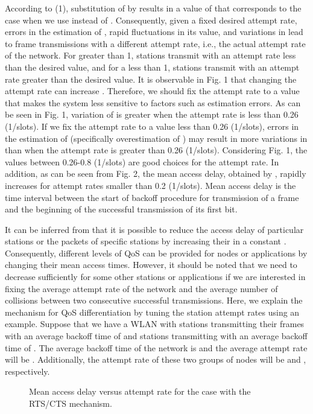\documentclass[10pt,twocolumn,oneside,submit]{JCNtran}
\begin{document}
\par According to (1), substitution of  by  results in a value of  that corresponds to the case when we use  instead of . Consequently, given a fixed desired attempt rate, errors in the estimation of , rapid fluctuations in its value, and variations in  lead to frame transmissions with a different attempt rate, i.e., the actual attempt rate of the network. For  greater than 1, stations transmit with an attempt rate less than the desired value, and for a  less than 1, stations transmit with an attempt rate greater than the desired value. It is observable in Fig. 1 that changing the attempt rate can increase . Therefore, we should fix the attempt rate to a value that makes the system less sensitive to factors such as estimation errors. As can be seen in Fig. 1, variation of  is greater when the attempt rate is less than 0.26 (1/slots). If we fix the attempt rate to a value less than 0.26 (1/slots), errors in the estimation of  (specifically overestimation of ) may result in more variations in  than when the attempt rate is greater than 0.26 (1/slots). Considering Fig. 1, the values between 0.26-0.8 (1/slots) are good choices for the attempt rate. In addition, as can be seen from Fig. 2, the mean access delay, obtained by  , rapidly increases for attempt rates smaller than 0.2 (1/slots). Mean access delay is the time interval between the start of backoff procedure for transmission of a frame and the beginning of the successful transmission of its first bit.
\par It can be inferred from  that it is possible to reduce the access delay of particular stations or the packets of specific stations by increasing their  in a constant . Consequently, different levels of QoS can be provided for nodes or applications by changing their mean access times. However, it should be noted that we need to decrease  sufficiently for some other stations or applications if we are interested in fixing the average attempt rate of the network and the average number of collisions between two consecutive successful transmissions. Here, we explain the mechanism for QoS differentiation by tuning the station attempt rates using an example. Suppose that we have a WLAN with  stations transmitting their frames with an average backoff time of  and  stations transmitting with an average backoff time of . The average backoff time of the network is  and the average attempt rate will be . Additionally, the attempt rate of these two groups of nodes will be  and , respectively.
\begin{figure}[t]
\begin{center}
\epsfxsize=8cm \leavevmode{} \caption{Mean access delay versus attempt rate for the case with the RTS/CTS mechanism.} \label{fig:2}
\end{center}
\end{figure}
\end{document}
